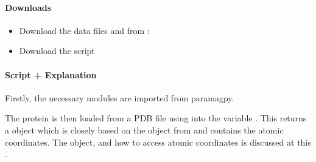 \documentclass[a4paper,10pt,english]{sphinxmanual}
\begin{document}
\paragraph{Downloads}
\label{\detokenize{examples/pcs_fit:downloads}}\begin{itemize}
\item {} 
Download the data files  and  from :

\item {} 
Download the script 

\end{itemize}


\paragraph{Script + Explanation}
\label{\detokenize{examples/pcs_fit:script-explanation}}
Firstly, the necessary modules are imported from paramagpy.

%
\begin{sphinxVerbatim}[commandchars=\\\{\}]
      
\end{sphinxVerbatim}

The protein is then loaded from a PDB file using {\hyperref[\detokenize{reference/generated/paramagpy.protein.load_pdb:paramagpy.protein.load_pdb}]{}} into the variable . This returns a  object which is closely based on the  object from  and contains the atomic coordinates. The object, and how to access atomic coordinates is discussed at this .

%
\begin{sphinxVerbatim}[commandchars=\\\{\}]
  
\end{sphinxVerbatim}
\end{document}
